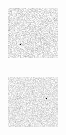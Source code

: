 \begin{figure}[!h]
\centering
    \begin{subfigure}[t]{.23\textwidth}
        \centering
        \includegraphics[width=\textwidth]{images/hotpixelA.png}
    \end{subfigure}
    \begin{subfigure}[t]{.23\textwidth}
        \centering
        \includegraphics[width=\textwidth]{images/hotpixelB.png}

\end{subfigure}
\end{figure}
